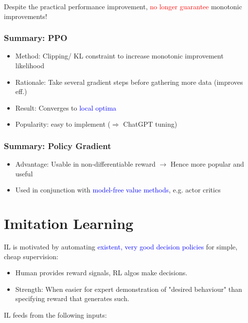\documentclass{article}
\begin{document}
\begin{warnbox}
    Despite the practical performance improvement, \textcolor{red}{no longer guarantee} monotonic improvements!
\end{warnbox}

\begin{defbox}
    \subsubsection*{Summary: PPO}
    \begin{itemize}
    \item Method: Clipping/ KL constraint to increase monotonic improvement likelihood
    \item Rationale: Take several gradient steps before gathering more data (improves eff.)
    \item Result: Converges to \textcolor{blue}{local optima}
    \item Popularity: easy to implement ($\Rightarrow$ ChatGPT tuning) 
    \end{itemize}

    \subsubsection*{Summary: Policy Gradient}
    \begin{itemize}
    \item Advantage: Usable in non-differentiable reward $\to$ Hence more popular and useful 
    \item Used in conjunction with \textcolor{blue}{model-free value methods}, e.g. actor critics
    \end{itemize}
\end{defbox}

\section{Imitation Learning}
IL is motivated by automating \textcolor{blue}{existent, very good decision policies} for simple, cheap supervision:
\begin{itemize}
\item Human provides reward signals, RL algos make decisions.
\item Strength: When easier for expert demonstration of "desired behaviour" than specifying reward that generates such.
\end{itemize}
IL feeds from the following inputs:
\end{document}
